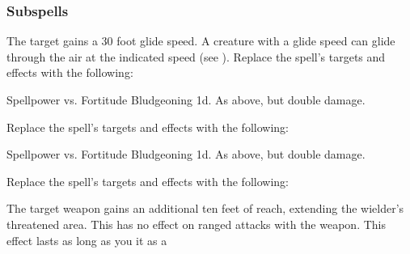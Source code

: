 \subsubsection{Subspells}
The target gains a 30 foot glide speed.
A creature with a glide speed can glide through the air at the indicated speed (see ).
Replace the spell's targets and effects with the following:
\begin{spellcontent}
\begin{augmenttargetinginfo}
\end{augmenttargetinginfo}
\begin{augmenteffects}
\begin{spellattack}{Spellpower vs. Fortitude}
\spellsuccess Bludgeoning  \plus1d.
\spellcritical As above, but double damage.
\end{spellattack}
\end{augmenteffects}
\end{spellcontent}
Replace the spell's targets and effects with the following:
\begin{spellcontent}
\begin{augmenttargetinginfo}
\end{augmenttargetinginfo}
\begin{augmenteffects}
\begin{spellattack}{Spellpower vs. Fortitude}
\spellsuccess Bludgeoning  \minus1d.
\spellcritical As above, but double damage.
\end{spellattack}
\end{augmenteffects}
\end{spellcontent}
Replace the spell's targets and effects with the following:
\begin{spellcontent}
\begin{augmenttargetinginfo}
\end{augmenttargetinginfo}
\begin{augmenteffects}
\spelleffect
The target weapon gains an additional ten feet of reach, extending the wielder's threatened area.
This has no effect on ranged attacks with the weapon.
This effect lasts as long as you  it as a 
\end{augmenteffects}
\end{spellcontent}
